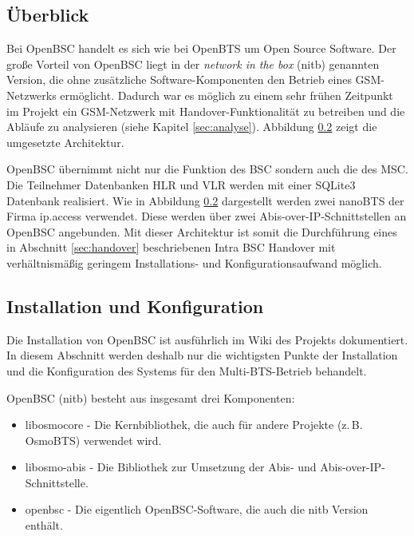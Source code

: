 \label{sec:openbsc}

\subsection{Überblick}

Bei OpenBSC handelt es sich wie bei OpenBTS um Open Source Software. Der große Vorteil von OpenBSC liegt in der \textit{network in the box} (nitb) genannten Version, die ohne zusätzliche Software-Komponenten den Betrieb eines GSM-Netzwerks ermöglicht. Dadurch war es möglich zu einem sehr frühen Zeitpunkt im Projekt ein GSM-Netzwerk mit Handover-Funktionalität zu betreiben und die Abläufe zu analysieren (siehe Kapitel \ref{sec:analyse}). Abbildung \ref{} zeigt die umgesetzte Architektur.



OpenBSC übernimmt nicht nur die Funktion des BSC sondern auch die des MSC. Die Teilnehmer Datenbanken HLR und VLR werden mit einer SQLite3 Datenbank realisiert. Wie in Abbildung \ref{} dargestellt werden zwei nanoBTS der Firma ip.access verwendet. Diese werden über zwei Abis-over-IP-Schnittstellen an OpenBSC angebunden. Mit dieser Architektur ist somit die Durchführung eines in Abschnitt \ref{sec:handover} beschriebenen Intra BSC Handover mit verhältnismäßig geringem Installations- und Konfigurationsaufwand möglich.

\subsection{Installation und Konfiguration}

Die Installation von OpenBSC ist ausführlich im Wiki des Projekts \cite{bib:buildopenbsc} dokumentiert. In diesem Abschnitt werden deshalb nur die wichtigsten Punkte der Installation und die Konfiguration des Systems für den Multi-BTS-Betrieb behandelt.

OpenBSC (nitb) besteht aus insgesamt drei Komponenten:

\begin{itemize}
 \item libosmocore - Die Kernbibliothek, die auch für andere Projekte (z.\,B. OsmoBTS) verwendet wird.
 \item libosmo-abis - Die Bibliothek zur Umsetzung der Abis- und Abis-over-IP-Schnittstelle.
 \item openbsc - Die eigentlich OpenBSC-Software, die auch die nitb Version enthält.
\end{itemize}


